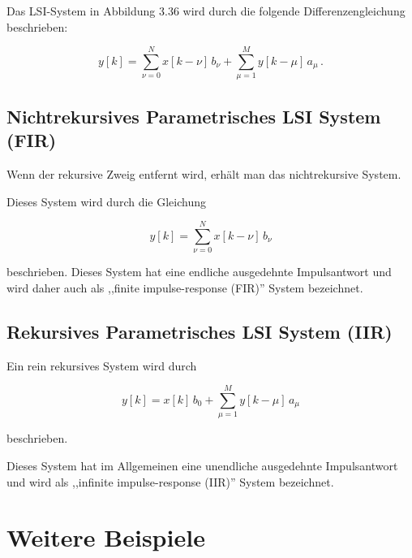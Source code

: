 Das LSI-System in Abbildung 3.36 wird durch die folgende Differenzengleichung beschrieben:

$$
y[k] = \sum_{\nu=0}^{N} x[k-\nu]\,b_\nu + \sum_{\mu=1}^{M} y[k-\mu]\,a_\mu\,.
$$

\subsection{Nichtrekursives Parametrisches LSI System (FIR)}
\label{sec:fir}

Wenn der rekursive Zweig entfernt wird, erhält man das nichtrekursive System.


Dieses System wird durch die Gleichung

$$
y[k] = \sum_{\nu=0}^{N} x[k-\nu]\,b_\nu
$$

beschrieben. Dieses System hat eine endliche ausgedehnte Impulsantwort und wird daher auch als ,,finite impulse-response (FIR)'' System bezeichnet.

\subsection{Rekursives Parametrisches LSI System (IIR)}
\label{sec:iir}

Ein rein rekursives System wird durch

$$
y[k] = x[k]\,b_0 + \sum_{\mu=1}^{M} y[k-\mu]\,a_\mu
$$

beschrieben.


Dieses System hat im Allgemeinen eine unendliche ausgedehnte Impulsantwort und wird als ,,infinite impulse-response (IIR)'' System bezeichnet.

\section{Weitere Beispiele}
\label{sec:lti-beispiele}

